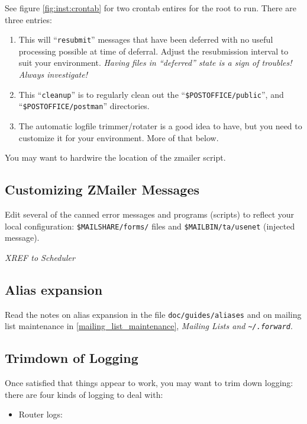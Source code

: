 \begin{multicols}{2}
See figure \vref{fig:inst:crontab} for two crontab entires for
the root to run.  There are three entries:
\begin{enumerate}
\item
This will ``{\tt resubmit}'' messages that have been deferred with
no useful processing possible at time of deferral.  Adjust the
resubmission interval to suit your environment.
{\em Having files in ``deferred'' state is a sign of troubles!
Always investigate!}

\item
This ``{\tt cleanup}'' is to regularly clean out
the ``{\tt \$POSTOFFICE/public}'', and ``{\tt \$POSTOFFICE/postman}''
directories.

\item
The automatic logfile trimmer/rotater is a good idea to have, but
you need to customize it for your environment.  More of that below.
\end{enumerate}

You may want to hardwire the location of the zmailer script.


\subsection{Customizing ZMailer Messages}

Edit several of the canned error messages and programs (scripts)
to reflect your local configuration: {\tt \$MAILSHARE/forms/} files and
{\tt \$MAILBIN/ta/usenet} (injected message).

{\large\em XREF to Scheduler}

\subsection{Alias expansion}

Read the notes on alias expansion in the file {\tt doc/guides/aliases} and
on mailing list maintenance in \vref{mailing_list_maintenance}, 
{\em Mailing Lists and \tt\~{}/.forward}.


\subsection{Trimdown of Logging}

Once satisfied that things appear to work, you may want to trim down
logging: there are four kinds of logging to deal with:
\begin{itemize}
\item Router logs:


\end{itemize}
\end{multicols}
